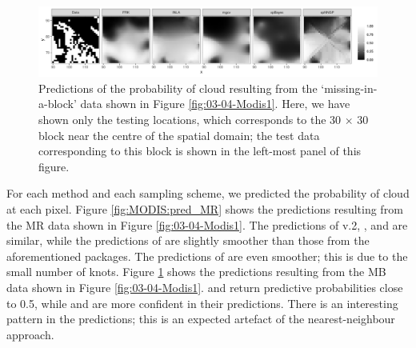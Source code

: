 \documentclass[nojss]{jss}
\begin{document}
\begin{figure}[t!]
    \centering
    \includegraphics[width = \linewidth]{img/MODIS_block_predictions.png}
     \caption{Predictions of the probability of cloud resulting from the `missing-in-a-block' data shown in Figure \ref{fig:03-04-Modis1}. Here, we have shown only the testing locations, which corresponds to the 30 $\times$ 30 block near the centre of the spatial domain; the test data corresponding to this block is shown in the left-most panel of this figure.}   
  \label{fig:MODIS:pred_block}
\end{figure}










 For each method and each sampling scheme, we predicted the probability of cloud at each pixel. 
 Figure \ref{fig:MODIS:pred_MR} shows the predictions resulting from the MR data shown in Figure \ref{fig:03-04-Modis1}. 
The predictions of  v.2, , and  are similar, 
 while the predictions of  are slightly smoother than those from the aforementioned packages.
 The predictions of  are even smoother; this is due to the small number of knots. 
 Figure \ref{fig:MODIS:pred_block} shows the predictions resulting from the MB data shown in Figure \ref{fig:03-04-Modis1}. 
  and  return predictive probabilities close to 0.5, while  and  are more confident in their predictions. 
 There is an interesting pattern in the  predictions; this is an expected artefact of the nearest-neighbour approach. 
 
 
 
\end{document}
